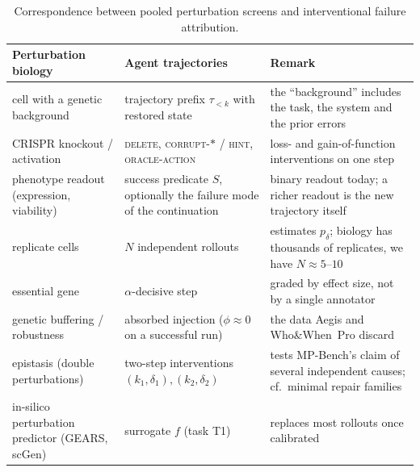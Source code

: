 \begin{table}[h]\centering\small
\begin{tabularx}{\linewidth}{@{}>{\RaggedRight}X >{\RaggedRight}X >{\RaggedRight}X@{}}\toprule
Perturbation biology & Agent trajectories & Remark \\\midrule
cell with a genetic background & trajectory prefix $\tau_{<k}$ with restored state & the ``background'' includes the task, the system and the prior errors \\
CRISPR knockout / activation & \textsc{delete}, \textsc{corrupt-}$\ast$ / \textsc{hint}, \textsc{oracle-action} & loss- and gain-of-function interventions on one step \\
phenotype readout (expression, viability) & success predicate $S$, optionally the failure mode of the continuation & binary readout today; a richer readout is the new trajectory itself \\
replicate cells & $N$ independent rollouts & estimates $p_\delta$; biology has thousands of replicates, we have $N\approx 5$--$10$ \\
essential gene & $\alpha$-decisive step & graded by effect size, not by a single annotator \\
genetic buffering / robustness & absorbed injection ($\phi\approx0$ on a successful run) & the data Aegis and Who\&When~Pro discard \\
epistasis (double perturbations) & two-step interventions $(k_1,\delta_1),(k_2,\delta_2)$ & tests MP-Bench's claim of several independent causes; cf.\ minimal repair families \cite{li2026mrfr} \\
in-silico perturbation predictor (GEARS, scGen) & surrogate $f$ (task T1) & replaces most rollouts once calibrated \\\bottomrule
\end{tabularx}
\caption{Correspondence between pooled perturbation screens and interventional failure attribution.}
\label{tab:analogy}
\end{table}

